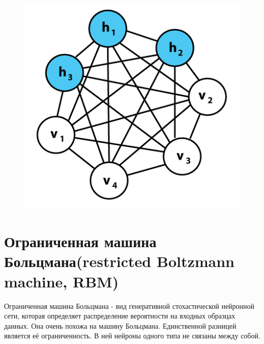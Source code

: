 \documentclass[paper=a4, fontsize=11pt]{scrartcl} %
\numberwithin{equation}{section} %
\numberwithin{figure}{section} %
\numberwithin{table}{section} %
\begin{document}
	\begin{figure}[h!]
		\centering
		\includegraphics[scale=0.45]{Boltzmannexamplev1}
	\end{figure}
	
	
	\section{Ограниченная машина Больцмана(restricted Boltzmann machine, RBM)}
	Ограниченная машина Больцмана - вид генеративной стохастической нейронной сети, которая определяет распределение вероятности на входных образцах данных.
	Она очень похожа на машину Больцмана. Единственной разницей является её ограниченность. В ней нейроны одного типа не связаны между собой.
	
\end{document}
